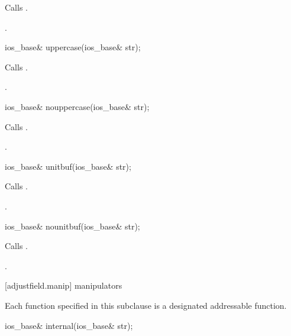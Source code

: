 \begin{itemdescr}
\pnum
\effects
Calls
.

\pnum
\returns
{}.
\end{itemdescr}

%
\begin{itemdecl}
ios_base& uppercase(ios_base& str);
\end{itemdecl}

\begin{itemdescr}
\pnum
\effects
Calls
.

\pnum
\returns
{}.
\end{itemdescr}

%
\begin{itemdecl}
ios_base& nouppercase(ios_base& str);
\end{itemdecl}

\begin{itemdescr}
\pnum
\effects
Calls
.

\pnum
\returns
{}.
\end{itemdescr}

%
\begin{itemdecl}
ios_base& unitbuf(ios_base& str);
\end{itemdecl}

\begin{itemdescr}
\pnum
\effects
Calls
.

\pnum
\returns
{}.
\end{itemdescr}

%
\begin{itemdecl}
ios_base& nounitbuf(ios_base& str);
\end{itemdecl}

\begin{itemdescr}
\pnum
\effects
Calls
.

\pnum
\returns
{}.
\end{itemdescr}

[adjustfield.manip]{ manipulators}

\pnum
Each function specified in this subclause
is a designated addressable function.

%
\begin{itemdecl}
ios_base& internal(ios_base& str);
\end{itemdecl}

